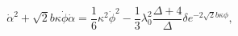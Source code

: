 \begin{equation}
\dot{\alpha}^2+\sqrt{2}b \kappa \dot{\phi} \dot{\alpha}=
\frac{1}{6} \kappa^2 \dot{\phi}^2-\frac{1}{3}\lambda_0^2 \frac{\Delta+4}{\Delta}
\delta e^{-2 \sqrt{2}b \kappa \phi},
\end{equation}

